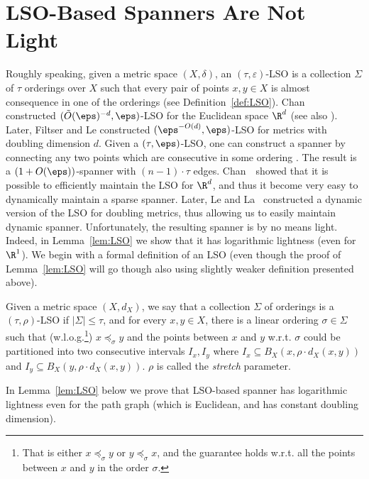 \section{LSO-Based Spanners Are Not Light}\label{sec:LSO}
Roughly speaking, given a metric space $(X,\delta)$, an $(\tau,\varepsilon)$-LSO is a collection $\Sigma$ of $\tau$ orderings over $X$ such that every pair of points $x,y\in X$ is almost consequence in one of the orderings (see Definition~\ref{def:LSO}).
Chan \etal~\cite{chan2020locality} constructed $(\tilde{O}(\eps)^{-d},\eps)$-LSO for the Euclidean space $\R^d$ (see also \cite{GaoH24}).
Later, Filtser and Le \cite{filtser2022locality} constructed  $(\eps^{-O(d)},\eps)$-LSO for metrics with doubling dimension $d$.
Given a $(\tau,\eps)$-LSO, one can construct a spanner by connecting any two points which are consecutive in some ordering \cite{chan2020locality}. The result is a $(1+O(\eps))$-spanner with $(n-1)\cdot \tau$ edges. 
Chan~\etal~showed that it is possible to efficiently maintain the LSO for $\R^d$, and thus it become very easy to dynamically maintain a sparse spanner.
Later,  Le and La~\cite{la2025dynamic} constructed a dynamic version of the LSO for doubling metrics, thus allowing us to easily maintain dynamic spanner.
Unfortunately, the resulting spanner is by no means light. Indeed, in Lemma~\ref{lem:LSO}  we show that it has logarithmic lightness (even for $\R^1$).
%
We begin with a formal definition of an LSO (even though the proof of Lemma~\ref{lem:LSO} will go though also using slightly weaker definition presented above).
\begin{definition}\label{def:LSO}
    Given a metric space $(X,d_{X})$, we say that a collection $\Sigma$
	of orderings is a $(\tau,\rho)$-LSO if
	$\left|\Sigma\right|\le\tau$, and for every $x,y\in X$, there is
	a linear ordering $\sigma\in\Sigma$ such that (w.l.o.g.\footnote{That is either  $x\preceq_{\sigma}y$ or  $y\preceq_{\sigma}x$, and the guarantee holds w.r.t. all the points between $x$ and $y$ in the order $\sigma$.\label{foot:wlogOrder}}) $x\preceq_{\sigma}y$ and the points between $x$ and $y$ w.r.t. $\sigma$ could be partitioned
	into two consecutive intervals $I_{x},I_{y}$ where $I_{x}\subseteq B_{X}(x,\rho\cdot d_{X}(x,y))$	and $I_{y}\subseteq B_{X}(y,\rho\cdot d_{X}(x,y))$. $\rho$ is called the \emph{stretch} parameter. 
\end{definition}
In Lemma~\ref{lem:LSO} below we prove that LSO-based spanner has logarithmic lightness even for the path graph (which is Euclidean, and has constant doubling dimension).
